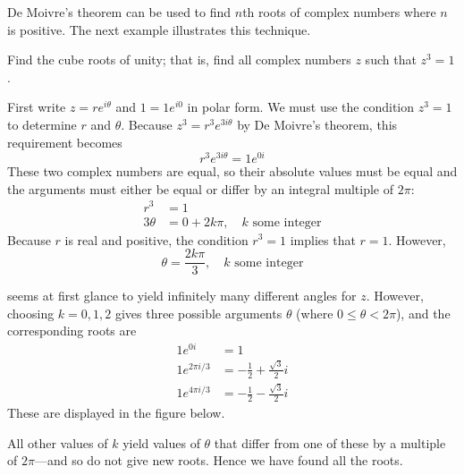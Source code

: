 \documentclass{ximera}
\begin{document}
De Moivre's theorem can be used to find $n$th roots of complex numbers where $n$ is positive. The next example illustrates this technique.


\begin{example}\label{ex:034107}
Find the cube roots of unity; that is, find all complex numbers $z$ such that $z^{3} = 1$.

\begin{explanation}
  First write $z = re^{i\theta}$ and $1 = 1e^{i0}$ in polar form. We must use the condition $z^{3} = 1$ to determine $r$ and $\theta$. Because $z^{3} = r^{3}e^{3i\theta}$ by De Moivre's theorem, this requirement becomes
\begin{equation*}
r^3 e^{3i\theta} = 1 e^{0i}
\end{equation*}
These two complex numbers are equal, so
 their absolute values must be equal and the arguments must either be
equal or differ by an integral multiple of $2\pi$:
\begin{align*}
r^3 & = 1 \\
3 \theta &= 0 +2k\pi, \quad k \mbox{ some integer}
\end{align*}
Because $r$ is real and positive, the condition $r^{3} = 1$ implies that $r = 1$. However,
\begin{equation*}
\theta = \frac{2k\pi}{3}, \quad k \mbox{ some integer}
\end{equation*}

seems at first glance to yield infinitely many different angles for $z$. However, choosing $k = 0, 1, 2$ gives three possible arguments $\theta$ (where $0 \leq \theta < 2\pi$), and the corresponding roots are
\begin{align*}
1e^{0i} & = 1 \\
1e^{2\pi i/3} & = -\frac{1}{2} + \frac{\sqrt{3}}{2} i \\
1e^{4\pi i/3} & = -\frac{1}{2} - \frac{\sqrt{3}}{2} i
\end{align*}
These are displayed in the figure below. 

\begin{center}
\end{center}

All other values of $k$
 yield values of $\theta$ that differ from one of these by a multiple of $2\pi$---and
 so do not give new roots. Hence we have found all the roots.
\end{explanation}
\end{example}
\end{document}
